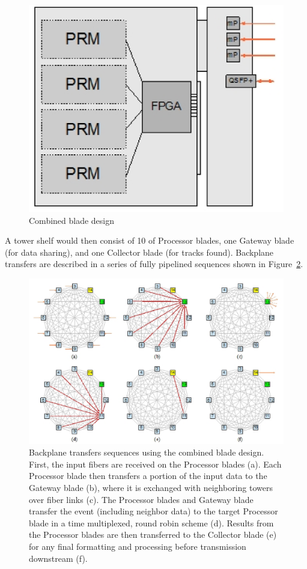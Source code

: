 \begin{figure}[ht!]
\centering
\includegraphics[width=0.45\columnwidth]{Plots/CombBlade.eps}
\caption{Combined blade design}
\label{fig:CombBlade}
\end{figure}


\noindent A tower shelf would then consist of 10 of Processor blades, one Gateway blade (for data sharing), and one Collector blade (for tracks found).  Backplane transfers are described in a series of fully pipelined sequences shown in Figure~\ref{fig:BackPlaneTr}.

\begin{figure}[ht!]
\centering
\includegraphics[width=0.9\columnwidth]{Plots/BackPlaneTr.eps}
\caption{Backplane transfers sequences using the combined blade design. First, the input fibers are received on the Processor blades (a).  Each Processor blade then transfers a portion of the input data to the Gateway blade (b), where it is exchanged with neighboring towers over fiber links (c).  The Processor blades and Gateway blade transfer the event (including neighbor data) to the target Processor blade in a time multiplexed, round robin scheme (d).   Results from the Processor blades are then transferred to the Collector blade (e) for any final formatting and processing before transmission downstream (f).}
\label{fig:BackPlaneTr}
\end{figure}
 

